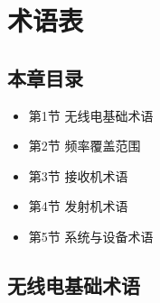 
\chapter{术语表}
\label{chap:glossary}

\section{本章目录}
\begin{itemize}
    \item 第1节 无线电基础术语
    \item 第2节 频率覆盖范围
    \item 第3节 接收机术语
    \item 第4节 发射机术语
    \item 第5节 系统与设备术语
\end{itemize}

\section{无线电基础术语}

